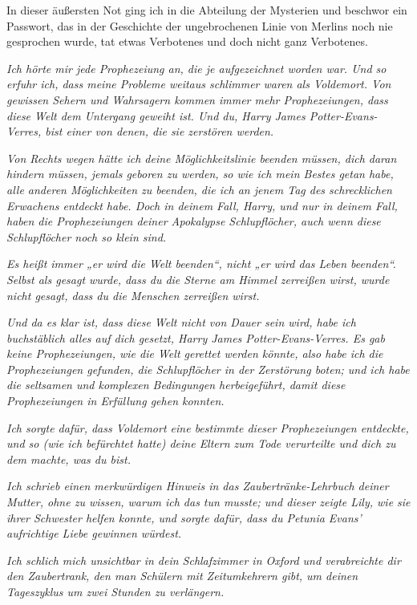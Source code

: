 {{In dieser äußersten Not ging ich in die Abteilung der Mysterien und beschwor ein Passwort, das in der Geschichte der ungebrochenen Linie von Merlins noch nie gesprochen wurde, tat etwas Verbotenes und doch nicht ganz Verbotenes.}

\emph{\hfill\break Ich hörte mir jede Prophezeiung an, die je aufgezeichnet worden war. Und so erfuhr ich, dass meine Probleme weitaus schlimmer waren als Voldemort. Von gewissen Sehern und Wahrsagern kommen immer mehr Prophezeiungen, dass diese Welt dem Untergang geweiht ist. Und du, Harry James Potter-Evans-Verres, bist einer von denen, die sie zerstören werden.}

\emph{Von Rechts wegen hätte ich deine Möglichkeitslinie beenden müssen, dich daran hindern müssen, jemals geboren zu werden, so wie ich mein Bestes getan habe, alle anderen Möglichkeiten zu beenden, die ich an jenem Tag des schrecklichen Erwachens entdeckt habe. Doch in deinem Fall, Harry, und nur in deinem Fall, haben die Prophezeiungen deiner Apokalypse Schlupflöcher, auch wenn diese Schlupflöcher noch so klein sind.}

\emph{\hfill\break Es heißt immer „er wird die Welt beenden“, nicht „er wird das Leben beenden“. Selbst als gesagt wurde, dass du die Sterne am Himmel zerreißen wirst, wurde nicht gesagt, dass du die Menschen zerreißen wirst.}

\emph{Und da es klar ist, dass diese Welt nicht von Dauer sein wird, habe ich buchstäblich alles auf dich gesetzt, Harry James Potter-Evans-Verres. Es gab keine Prophezeiungen, wie die Welt gerettet werden könnte, also habe ich die Prophezeiungen gefunden, die Schlupflöcher in der Zerstörung boten; und ich habe die seltsamen und komplexen Bedingungen herbeigeführt, damit diese Prophezeiungen in Erfüllung gehen konnten.}

\emph{\hfill\break Ich sorgte dafür, dass Voldemort eine bestimmte dieser Prophezeiungen entdeckte, und so (wie ich befürchtet hatte) deine Eltern zum Tode verurteilte und dich zu dem machte, was du bist.}

\emph{Ich schrieb einen merkwürdigen Hinweis in das Zaubertränke-Lehrbuch deiner Mutter, ohne zu wissen, warum ich das tun musste; und dieser zeigte Lily, wie sie ihrer Schwester helfen konnte, und sorgte dafür, dass du Petunia Evans' aufrichtige Liebe gewinnen würdest.}

\emph{Ich schlich mich unsichtbar in dein Schlafzimmer in Oxford und verabreichte dir den Zaubertrank, den man Schülern mit Zeitumkehrern gibt, um deinen Tageszyklus um zwei Stunden zu verlängern.}

}
